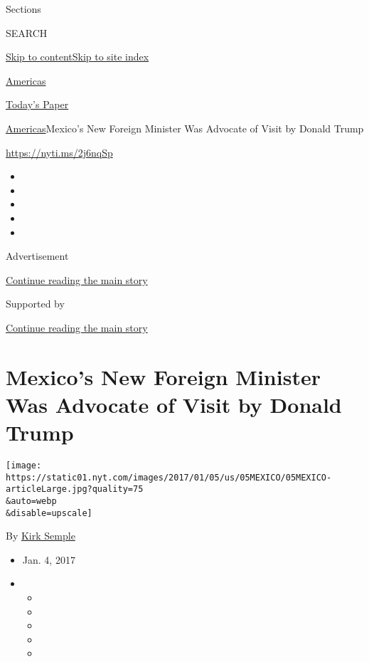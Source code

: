 Sections

SEARCH

\protect\hyperlink{site-content}{Skip to
content}\protect\hyperlink{site-index}{Skip to site index}

\href{https://www.nytimes.com/section/world/americas}{Americas}

\href{https://myaccount.nytimes.com/auth/login?response_type=cookie\&client_id=vi}{}

\href{https://www.nytimes.com/section/todayspaper}{Today's Paper}

\href{/section/world/americas}{Americas}\textbar{}Mexico's New Foreign
Minister Was Advocate of Visit by Donald Trump

\url{https://nyti.ms/2j6nqSp}

\begin{itemize}
\item
\item
\item
\item
\item
\end{itemize}

Advertisement

\protect\hyperlink{after-top}{Continue reading the main story}

Supported by

\protect\hyperlink{after-sponsor}{Continue reading the main story}

\hypertarget{mexicos-new-foreign-minister-was-advocate-of-visit-by-donald-trump}{%
\section{Mexico's New Foreign Minister Was Advocate of Visit by Donald
Trump}\label{mexicos-new-foreign-minister-was-advocate-of-visit-by-donald-trump}}

\texttt{[image: https://static01.nyt.com/images/2017/01/05/us/05MEXICO/05MEXICO-articleLarge.jpg?quality=75\\\&auto=webp\\\&disable=upscale]}

By \href{http://www.nytimes.com/by/kirk-semple}{Kirk Semple}

\begin{itemize}
\item
  Jan. 4, 2017
\item
  \begin{itemize}
  \item
  \item
  \item
  \item
  \item
  \end{itemize}
\end{itemize}

